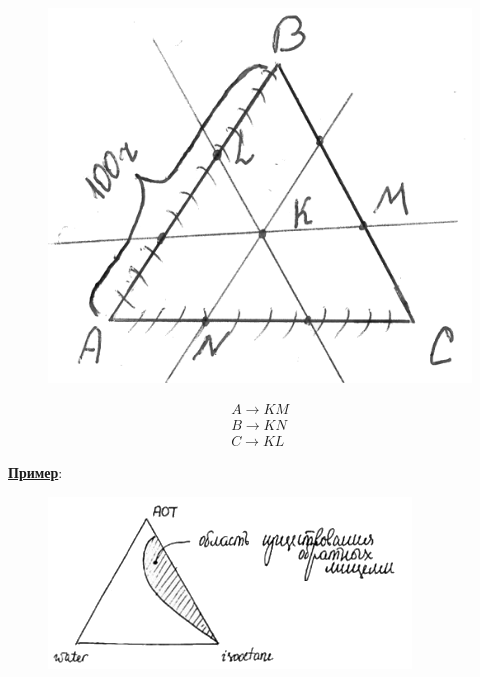 \begin{lecture}
	\begin{lecSection}
		\begin{figure}
			\centering\includegraphics[width=\linewidth]{lecture_08/new_triangle_rozebum}
			\label{fig:triangle_rozebum}
		\end{figure}
	\begin{gather*}
		A \rightarrow KM \\
		B \rightarrow KN \\
		C \rightarrow KL
	\end{gather*}
	
	\centering\underline{\textbf{Пример}}:
	\begin{figure}[H]
		\centering\includegraphics[width=0.7\linewidth]{lecture_08/new_triangle_example}
		\label{fig:triangle_example}
	\end{figure}
	\end{lecSection}
	

\end{lecture}
